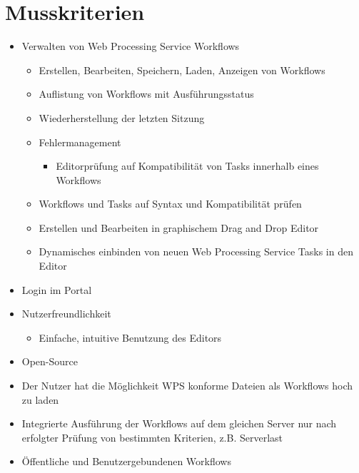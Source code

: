 		\section{Musskriterien}
			\begin{itemize}
				\item Verwalten von \gls{Web Processing Service} Workflows
					\begin{itemize}
						\item Erstellen, Bearbeiten, Speichern, Laden, Anzeigen von Workflows
						\item Auflistung von Workflows mit Ausführungsstatus
						\item Wiederherstellung der letzten Sitzung
						\item Fehlermanagement
						    \begin{itemize}
                            	\item Editorprüfung auf Kompatibilität von Tasks innerhalb eines Workflows
                            \end{itemize}
						\item Workflows und \Gls{Task}s auf Syntax und Kompatibilität prüfen
						\item Erstellen und Bearbeiten in graphischem \Gls{Drag and Drop} Editor
						\item Dynamisches einbinden von neuen \gls{Web Processing Service} Tasks in den Editor
					\end{itemize}
				\item Login im Portal
				\item Nutzerfreundlichkeit
					\begin{itemize}
						\item Einfache, intuitive Benutzung des Editors
					\end{itemize}
				\item Open-Source
				\item Der Nutzer hat die Möglichkeit WPS konforme Dateien als Workflows hoch zu laden
				\item Integrierte Ausführung der Workflows auf dem gleichen Server nur nach erfolgter Prüfung von bestimmten Kriterien, z.B. Serverlast
				\item Öffentliche und Benutzergebundenen Workflows

\end{itemize}

